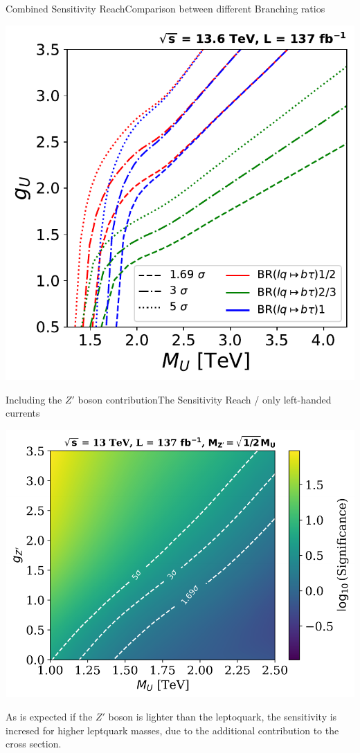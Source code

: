\documentclass{../bredelebeamer}
\begin{document}
\begin{frame}{Combined Sensitivity Reach}{Comparison between different Branching ratios}
	\begin{center}
		\includegraphics[width=.68\linewidth]{Significance_Curves_Summary_by_BR.pdf}
	\end{center}
\end{frame}

\begin{frame}{Including the $Z'$ boson contribution}{The Sensitivity Reach / only left-handed currents}
	\begin{center}
		\includegraphics[width=.68\linewidth]{zp_lower_limit_woRHC_gu1_75.pdf}
	\end{center}
	{\large
		  As is expected if the $Z'$ boson is lighter than the leptoquark, the sensitivity is incresed for higher leptquark masses, due to the additional contribution to the cross section.
	}
\end{frame}
\end{document}
